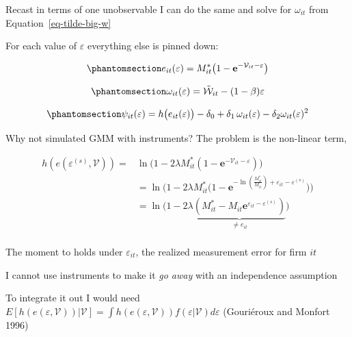 \documentclass[
  ignorenonframetext,
  aspectratio=169,
]{beamer}
\begin{document}
\begin{frame}{Recast in terms of one unobservable}
\protect{}\label{recast-in-terms-of-one-unobservable}
I can do the same and solve for \(\omega_{it}\) from
Equation~\ref{eq-tilde-big-w}

For each value of \(\varepsilon\) everything else is pinned down:

\begin{equation}\protect\phantomsection\label{eq-e-eps}{
e_{it}(\varepsilon)=M^*_{it}\big(1-\textbf{e}^{-\mathcal V_{it}-\varepsilon}\big)
}\end{equation}

\begin{equation}\protect\phantomsection\label{eq-w-eps}{
\omega_{it}(\varepsilon)=\tilde{\mathcal W}_{it}-(1-\beta)\varepsilon
}\end{equation}

\begin{equation}\protect\phantomsection\label{eq-psi-eps}{
\psi_{it}(\varepsilon)=h\big(e_{it}(\varepsilon)\big)-\delta_0+\delta_1\,\omega_{it}(\varepsilon)-\delta_2\omega_{it}(\varepsilon)^2
}\end{equation}
\end{frame}

\begin{frame}{Why not simulated GMM with instruments?}
\protect{}\label{why-not-simulated-gmm-with-instruments}
The problem is the non-linear term,

\[
\begin{aligned}
    h(e(\varepsilon^{(s)},\mathcal{V}))=&\ln\!\big(1-2\lambda M^*_{it}(1-\textbf{e}^{-\mathcal V_{it}-\varepsilon})\big)\\
    &=\ln\!\big(1-2\lambda M^*_{it}\big(1-\textbf{e}^{-\ln\left(\frac{M^*_{it}}{M_{it}}\right)+\varepsilon_{it}-\varepsilon^{(s)}}\big)\big)\\
    &=\ln\!\big(1-2\lambda \underbrace{\left(M^*_{it}-M_{it}\textbf{e}^{\varepsilon_{it}-\varepsilon^{(s)}}\right)}_{\ne e_{it}}\big)\\
\end{aligned}
\]

The moment to holds under \(\varepsilon_{it}\), the realized measurement
error for firm \(it\)

I cannot use instruments to make it \emph{go away} with an independence
assumption

To integrate it out I would need
\(E[h(e(\varepsilon,\mathcal{V}))|\mathcal{V}]=\int h(e(\varepsilon,\mathcal{V}))f(\varepsilon|\mathcal{V})d\varepsilon\)
(Gouriéroux and Monfort 1996)
\end{frame}
\end{document}
